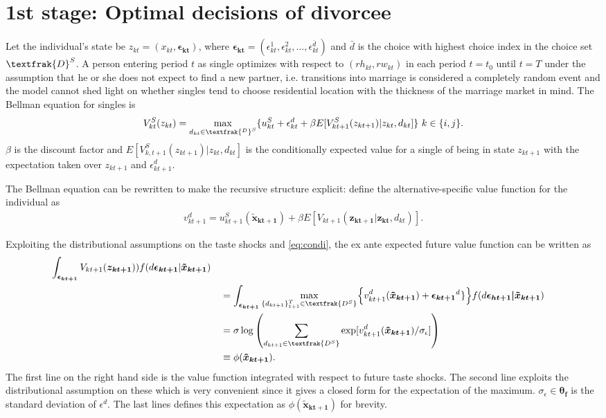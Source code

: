 \section{1st stage: Optimal decisions of divorcee}
Let the individual's state be $z_{kt}=(x_{kt},\boldsymbol{\epsilon_{kt}})$, where $\boldsymbol{\epsilon_{kt}}=(\epsilon_{kt}^1,\epsilon_{kt}^2,...,\epsilon_{kt}^{\bar{d}})$ and $\bar{d}$ is the choice with highest choice index in the choice set $\textfrak{D}^S$. A person entering period $t$ as single optimizes with respect to $(rh_{kt},rw_{kt})$ in each period $t=t_0$ until $t=T$ under the assumption that he or she does not expect to find a new partner, i.e. transitions into marriage is considered a completely random event and the model cannot shed light on whether singles tend to choose residential location with the thickness of the marriage market in mind. The Bellman equation for singles is
\begin{align}
V_{kt}^S(z_{kt})= \max_{d_{kt}\in \textfrak{^D}^S}\{u_{kt}^S+\epsilon_{kt}^d+\beta E[V_{kt+1}^S(z_{kt+1})|z_{kt},d_{kt}]\} \text{ }k\in\{i,j\}.
\label{eq:Vk}
\end{align}
$\beta$ is the discount factor and $E[V_{k,t+1}^S(z_{kt+1})|z_{kt},d_{kt}]$ is the conditionally expected value for a single of being in state $z_{kt+1}$ with the expectation taken over $z_{kt+1}$ and $\epsilon_{kt+1}^d$. 

The Bellman equation can be rewritten to make the recursive structure explicit: define the alternative-specific value function for the individual as
\begin{align}
v_{kt+1}^d=u_{kt+1}^S(\boldsymbol{\tilde{x}_{kt+1}})+\beta E[V_{kt+1}(\boldsymbol{z_{kt+1}}|\boldsymbol{z_{kt}},d_{kt})].
\label{eq:vk}
\end{align}

Exploiting the distributional assumptions on the taste shocks and \eqref{eq:condi}, the ex ante expected future value function can be written as
\begin{alignat*}{3}
\int_{\boldsymbol{\epsilon_{kt+1}}}{ V_{kt+1}(\boldsymbol{z_{kt+1}}))f(d\boldsymbol{\epsilon_{kt+1}}|\boldsymbol{\tilde{x}_{kt+1}})} \\
& &&= \int_{\boldsymbol{\epsilon_{kt+1}}}{ \max_{\{d_{kt+1}\}_{t+1}^{T}\in \textfrak{D^S}_{}} } \Big\{v_{kt+1}^{d_{}}(\boldsymbol{\tilde{x}_{kt+1}}) +\boldsymbol{\epsilon_{kt+1}}^{d_{}}\} \Big\}f(d\boldsymbol{\epsilon_{ht+1}|\tilde{x}_{kt+1}}) \\
& &&=\sigma \log {\left( \sum_{d_{kt+1} \in \textfrak{D^S}} { \exp[v_{kt+1}^{d_{}}(\boldsymbol{\tilde{x}_{kt+1}})/ \sigma_{\epsilon}]  } \right)} \\
& &&\equiv\phi(\boldsymbol{\tilde{x}_{kt+1}}). 
\end{alignat*}
The first line on the right hand side is the value function integrated with respect to future taste shocks. The second line exploits the distributional assumption on these which is very convenient since it gives a closed form for the expectation of the maximum. $\sigma_{\epsilon}\in\boldsymbol{\theta_f}$ is the standard deviation of $\epsilon^d.$ The last lines defines this expectation as $\phi(\boldsymbol{\tilde{x}_{kt+1}})$ for brevity.

